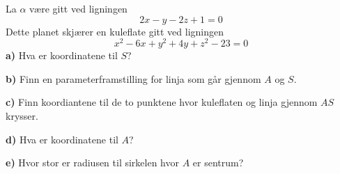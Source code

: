 La $ \alpha $ være gitt ved ligningen 
\[ 2x - y - 2z +1=0   \] 
Dette planet skjærer en kuleflate gitt ved ligningen
\[x^2 - 6x + y^2 + 4y + z^2 -23 = 0 \]
\textbf{a)} Hva er koordinatene til $ S $?\os

\textbf{b)} Finn en parameterframstilling for linja som går gjennom $ A $ og $ S $.\os

\textbf{c)} Finn koordiantene til de to punktene hvor kuleflaten og linja gjennom $ AS $ krysser.\os

\textbf{d)} Hva er koordinatene til $ A $?\os

\textbf{e)} Hvor stor er radiusen til sirkelen hvor $ A $ er sentrum?
\newpage


